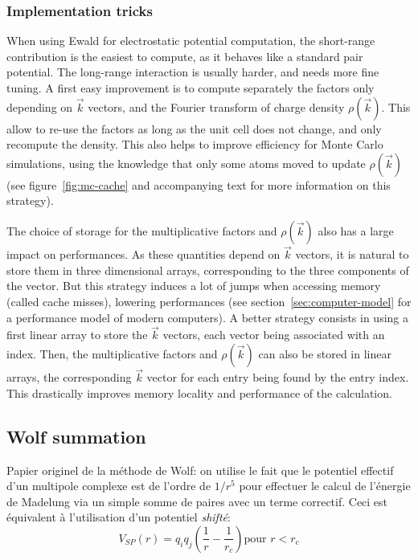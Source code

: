 \documentclass[thesis]{subfiles}
\begin{document}
\subsubsection{Implementation tricks}

When using Ewald for electrostatic potential computation, the short-range
contribution is the easiest to compute, as it behaves like a standard pair
potential. The long-range interaction is usually harder, and needs more fine
tuning. A first easy improvement is to compute separately the factors only
depending on $\vec k$ vectors, and the Fourier transform of charge density
$\rho(\vec k)$. This allow to re-use the factors as long as the unit cell does
not change, and only recompute the density. This also helps to improve
efficiency for Monte Carlo simulations, using the knowledge that only some atoms
moved to update $\rho(\vec k)$ (see figure~\ref{fig:mc-cache} and accompanying
text for more information on this strategy).

The choice of storage for the multiplicative factors and $\rho(\vec k)$ also has
a large impact on performances. As these quantities depend on $\vec k$ vectors,
it is natural to store them in three dimensional arrays, corresponding to the
three components of the vector. But this strategy induces a lot of jumps when
accessing memory (called cache misses), lowering performances (see
section~\ref{sec:computer-model} for a performance model of modern computers).
A better strategy consists in using a first linear array to store the $\vec k$
vectors, each vector being associated with an index. Then, the multiplicative
factors and $\rho(\vec k)$ can also be stored in linear arrays, the
corresponding $\vec k$ vector for each entry being found by the entry index.
This drastically improves memory locality and performance of the calculation.


\newpage
\subsection{Wolf summation}

Papier originel de la méthode de Wolf\cite{Wolf1999}: on utilise le fait que le
potentiel effectif d'un multipole complexe est de l'ordre de $1/r^5$ pour
effectuer le calcul de l'énergie de Madelung via un simple somme de paires avec
un terme correctif. Ceci est équivalent à l'utilisation d'un potentiel
\emph{shifté}:
\[V_{SP}(r) = q_i q_j \left(\frac{1}{r} - \frac{1}{r_c} \right) \text{pour } r < r_c\]
\end{document}
